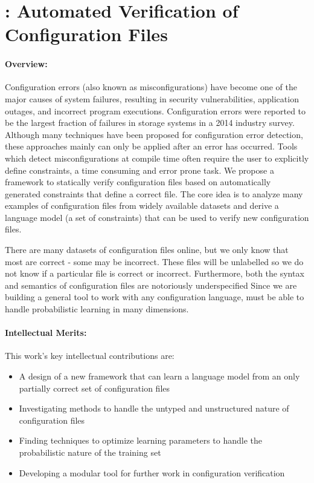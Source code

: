\section*{\app: Automated Verification of Configuration Files}
\paragraph{Overview:} 
Configuration errors (also known as misconfigurations) have become one of the major causes of system failures, resulting in security vulnerabilities, application outages, and incorrect program executions. 
Configuration errors were reported to be the largest fraction of failures in storage systems in a 2014 industry survey. 
Although many techniques have been proposed for configuration error detection, these approaches mainly can only be applied after an error has occurred.
Tools which detect misconfigurations at compile time often require the user to explicitly define constraints, a time consuming and error prone task.
We propose a framework to statically verify configuration files based on automatically generated constraints that define a correct file.
The core idea is to analyze many examples of configuration files from widely available datasets and derive a language model (a set of constraints) that can be used to verify new configuration files.

There are many datasets of configuration files online, but we only know that most are correct - some may be incorrect.
These files will be unlabelled so we do not know if a particular file is correct or incorrect.
Furthermore, both the syntax and semantics of configuration files are notoriously underspecified
Since we are building a general tool to work with any configuration language, \app must be able to handle probabilistic learning in many dimensions.

\paragraph{Intellectual Merits:} This work's key intellectual contributions are:
\begin{itemize}
\item A design of a new framework that can learn a language model from an only partially correct set of configuration files
\item Investigating methods to handle the untyped and unstructured nature of configuration files
\item Finding techniques to optimize learning parameters to handle the probabilistic nature of the training set
\item Developing a modular tool for further work in configuration verification
\end{itemize}

